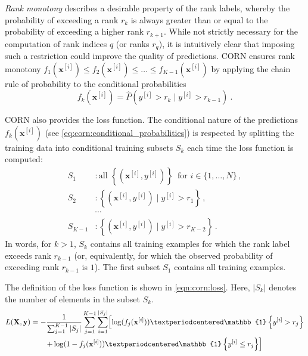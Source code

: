 \emph{Rank monotony} describes a desirable property of the rank labels,
whereby the probability of exceeding a rank $r_k$ is always greater than or equal to the probability of exceeding a higher rank $r_{k+1}$.
%
While not strictly necessary for the computation of rank indices $q$ (or ranks $r_q$),
it is intuitively clear that imposing such a restriction could improve the quality of predictions.
%
\Ac{CORN} ensures rank monotony
  $f_1(\mathbf{x}^{[i]}) \leq f_2(\mathbf{x}^{[i]}) \leq \ldots \leq f_{K-1}(\mathbf{x}^{[i]})$
by applying the chain rule of probability
to the conditional probabilities
\begin{equation}
  f_k(\mathbf{x}^{[i]}) = \hat{P}\left( y^{[i]} > r_k \mid y^{[i]} > r_{k-1} \right) \ .
  \label{eq:corn:conditional_probabilities}
\end{equation}
%

\Ac{CORN} also provides the loss function.
The conditional nature of the predictions $f_k(\mathbf{x}^{[i]})$
  (see \autoref{eq:corn:conditional_probabilities})
is respected
by splitting the training data into conditional training subsets $S_k$
  each time the loss function is computed:
\begin{align*}
  S_1 &: \text{all } \left\{\left( \mathbf{x}^{[i]}, y^{[i]} \right)\right\} \, \text{ for } i \in \{1, \ldots, N\} \, , \\
  S_2 &: \left\{\left( \mathbf{x}^{[i]}, y^{[i]} \right) \;\big\vert\; y^{[i]} > r_1 \right\} \, , \\
  &\cdots \\
  S_{K-1} &: \left\{\left( \mathbf{x}^{[i]}, y^{[i]} \right) \;\big\vert\; y^{[i]} > r_{K-2} \right\} \, .
\end{align*}
In words,
for $k > 1$,
  $S_k$ contains all training examples
  for which the rank label exceeds rank $r_{k-1}$
    (or, equivalently, for which the observed probability of exceeding rank $r_{k-1}$ is $1$).
The first subset $S_1$ contains all training examples.

The definition of the loss function is shown in \autoref{eqn:corn:loss}.
Here, $|S_k|$ denotes the number of elements in the subset $S_k$.
\begin{multline}
  \label{eqn:corn:loss}
  L(\mathbf{X}, \mathbf{y}) =
  - \frac{1}{\sum_{j=1}^{K-1} |S_j|}
  \sum_{j=1}^{K-1}
  \sum_{i=1}^{|S_j|}
  \Bigl[
    \log(f_j(\mathbf{x}^{[i]})) · \mathbb{1}\left\{y^{[i]} > r_j\right\}
    \\
    +
    \log(1 - f_j(\mathbf{x}^{[i]})) · \mathbb{1}\left\{y^{[i]} \leq r_j\right\}
  \Bigr]
\end{multline}


